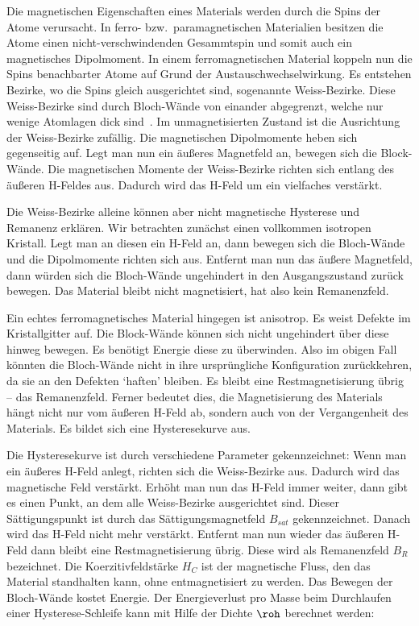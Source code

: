 \documentclass[a4paper,10pt,twocolumn]{article}
\begin{document}
    Die magnetischen Eigenschaften eines Materials werden durch die Spins der Atome verursacht.
    In ferro- bzw.\ paramagnetischen Materialien besitzen die Atome einen nicht-verschwindenden Gesammtspin
    und somit auch ein magnetisches Dipolmoment.
    In einem ferromagnetischen Material koppeln nun die Spins benachbarter Atome auf Grund der Austauschwechselwirkung.
    Es entstehen Bezirke, wo die Spins gleich ausgerichtet sind, sogenannte Weiss-Bezirke.
    Diese Weiss-Bezirke sind durch Bloch-Wände von einander abgegrenzt, welche nur wenige Atomlagen dick sind~\cite{feymanLecturesWeisDomains}.
    Im unmagnetisierten Zustand ist die Ausrichtung der Weiss-Bezirke zufällig.
    Die magnetischen Dipolmomente heben sich gegenseitig auf.
    Legt man nun ein äußeres Magnetfeld an, bewegen sich die Block-Wände.
    Die magnetischen Momente der Weiss-Bezirke richten sich entlang des äußeren H-Feldes aus.
    Dadurch wird das H-Feld um ein vielfaches verstärkt.
    
    Die Weiss-Bezirke alleine können aber nicht magnetische Hysterese und Remanenz erklären.
    Wir betrachten zunächst einen vollkommen isotropen Kristall.
    Legt man an diesen ein H-Feld an, dann bewegen sich die Bloch-Wände und die Dipolmomente richten sich aus.
    Entfernt man nun das äußere Magnetfeld, dann würden sich die Bloch-Wände ungehindert in den Ausgangszustand
    zurück bewegen.
    Das Material bleibt nicht magnetisiert, hat also kein Remanenzfeld.
    
    Ein echtes ferromagnetisches Material hingegen ist anisotrop.
    Es weist Defekte im Kristallgitter auf.
    Die Block-Wände können sich nicht ungehindert über diese hinweg bewegen.
    Es benötigt Energie diese zu überwinden.
    Also im obigen Fall könnten die Bloch-Wände nicht in ihre ursprüngliche Konfiguration zurückkehren,
    da sie an den Defekten `haften' bleiben.
    Es bleibt eine Restmagnetisierung übrig -- das Remanenzfeld.
    Ferner bedeutet dies, die Magnetisierung des Materials hängt nicht nur vom äußeren H-Feld ab, sondern auch von
    der Vergangenheit des Materials.
    Es bildet sich eine Hysteresekurve aus.
    
    Die Hysteresekurve ist durch verschiedene Parameter gekennzeichnet:
    Wenn man ein äußeres H-Feld anlegt, richten sich die Weiss-Bezirke aus.
    Dadurch wird das magnetische Feld verstärkt.
    Erhöht man nun das H-Feld immer weiter, dann gibt es einen Punkt, an dem alle Weiss-Bezirke ausgerichtet sind.
    Dieser Sättigungspunkt ist durch das Sättigungsmagnetfeld $B_{sat}$ gekennzeichnet.
    Danach wird das H-Feld nicht mehr verstärkt.
    Entfernt man nun wieder das äußeren H-Feld dann bleibt eine Restmagnetisierung übrig.
    Diese wird als Remanenzfeld $B_R$ bezeichnet.
    Die Koerzitivfeldstärke $H_C$ ist der magnetische Fluss, den das Material standhalten kann,
    ohne entmagnetisiert zu werden.
    Das Bewegen der Bloch-Wände kostet Energie.
    Der Energieverlust pro Masse beim Durchlaufen einer Hysterese-Schleife kann mit Hilfe der Dichte $\roh$
    berechnet werden:
    
\end{document}
